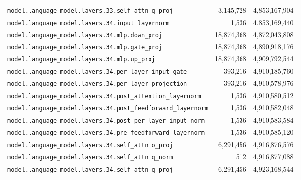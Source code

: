 \documentclass[10pt,a4paper]{article}
\theoremstyle{definition}
\begin{document}
\begin{appendices}
\begin{longtable}{p{9.5cm}rr}
\texttt{model.\allowbreak{}language\_model.\allowbreak{}layers.\allowbreak{}33.\allowbreak{}self\_attn.\allowbreak{}q\_proj} & 3,145,728 & 4,853,167,904 \\
\texttt{model.\allowbreak{}language\_model.\allowbreak{}layers.\allowbreak{}34.\allowbreak{}input\_layernorm} & 1,536 & 4,853,169,440 \\
\texttt{model.\allowbreak{}language\_model.\allowbreak{}layers.\allowbreak{}34.\allowbreak{}mlp.\allowbreak{}down\_proj} & 18,874,368 & 4,872,043,808 \\
\texttt{model.\allowbreak{}language\_model.\allowbreak{}layers.\allowbreak{}34.\allowbreak{}mlp.\allowbreak{}gate\_proj} & 18,874,368 & 4,890,918,176 \\
\texttt{model.\allowbreak{}language\_model.\allowbreak{}layers.\allowbreak{}34.\allowbreak{}mlp.\allowbreak{}up\_proj} & 18,874,368 & 4,909,792,544 \\
\texttt{model.\allowbreak{}language\_model.\allowbreak{}layers.\allowbreak{}34.\allowbreak{}per\_layer\_input\_gate} & 393,216 & 4,910,185,760 \\
\texttt{model.\allowbreak{}language\_model.\allowbreak{}layers.\allowbreak{}34.\allowbreak{}per\_layer\_projection} & 393,216 & 4,910,578,976 \\
\texttt{model.\allowbreak{}language\_model.\allowbreak{}layers.\allowbreak{}34.\allowbreak{}post\_attention\_layernorm} & 1,536 & 4,910,580,512 \\
\texttt{model.\allowbreak{}language\_model.\allowbreak{}layers.\allowbreak{}34.\allowbreak{}post\_feedforward\_layernorm} & 1,536 & 4,910,582,048 \\
\texttt{model.\allowbreak{}language\_model.\allowbreak{}layers.\allowbreak{}34.\allowbreak{}post\_per\_layer\_input\_norm} & 1,536 & 4,910,583,584 \\
\texttt{model.\allowbreak{}language\_model.\allowbreak{}layers.\allowbreak{}34.\allowbreak{}pre\_feedforward\_layernorm} & 1,536 & 4,910,585,120 \\
\texttt{model.\allowbreak{}language\_model.\allowbreak{}layers.\allowbreak{}34.\allowbreak{}self\_attn.\allowbreak{}o\_proj} & 6,291,456 & 4,916,876,576 \\
\texttt{model.\allowbreak{}language\_model.\allowbreak{}layers.\allowbreak{}34.\allowbreak{}self\_attn.\allowbreak{}q\_norm} & 512 & 4,916,877,088 \\
\texttt{model.\allowbreak{}language\_model.\allowbreak{}layers.\allowbreak{}34.\allowbreak{}self\_attn.\allowbreak{}q\_proj} & 6,291,456 & 4,923,168,544 \\

\end{longtable}
\end{appendices}
\end{document}

